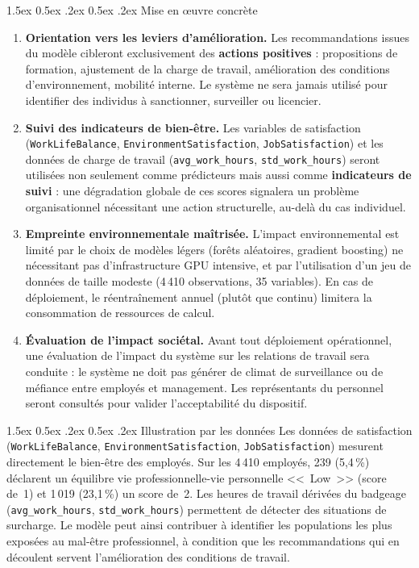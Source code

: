 \documentclass[12pt,a4paper]{article}
\makeatletter
\renewcommand\paragraph{\@startsection{paragraph}{4}{\z@}%
  {1.5ex \@plus 0.5ex \@minus .2ex}%
  {0.5ex \@plus .2ex}%
  {\normalfont\normalsize\bfseries}}
\makeatother
\begin{document}
\paragraph{Mise en \oe uvre concrète}
\begin{enumerate}
    \item \textbf{Orientation vers les leviers d'amélioration.} Les recommandations issues du modèle cibleront exclusivement des \textbf{actions positives} : propositions de formation, ajustement de la charge de travail, amélioration des conditions d'environnement, mobilité interne. Le système ne sera jamais utilisé pour identifier des individus à sanctionner, surveiller ou licencier.
    \item \textbf{Suivi des indicateurs de bien-être.} Les variables de satisfaction (\texttt{WorkLifeBalance}, \texttt{EnvironmentSatisfaction}, \texttt{JobSatisfaction}) et les données de charge de travail (\texttt{avg\_work\_hours}, \texttt{std\_work\_hours}) seront utilisées non seulement comme prédicteurs mais aussi comme \textbf{indicateurs de suivi} : une dégradation globale de ces scores signalera un problème organisationnel nécessitant une action structurelle, au-delà du cas individuel.
    \item \textbf{Empreinte environnementale maîtrisée.} L'impact environnemental est limité par le choix de modèles légers (forêts aléatoires, gradient boosting) ne nécessitant pas d'infrastructure GPU intensive, et par l'utilisation d'un jeu de données de taille modeste (4\,410 observations, 35 variables). En cas de déploiement, le réentraînement annuel (plutôt que continu) limitera la consommation de ressources de calcul.
    \item \textbf{Évaluation de l'impact sociétal.} Avant tout déploiement opérationnel, une évaluation de l'impact du système sur les relations de travail sera conduite : le système ne doit pas générer de climat de surveillance ou de méfiance entre employés et management. Les représentants du personnel seront consultés pour valider l'acceptabilité du dispositif.
\end{enumerate}

\paragraph{Illustration par les données}
Les données de satisfaction (\texttt{WorkLifeBalance}, \texttt{EnvironmentSatisfaction}, \texttt{JobSatisfaction}) mesurent directement le bien-être des employés. Sur les 4\,410 employés, 239 (5,4\,\%) déclarent un équilibre vie professionnelle-vie personnelle <<~Low~>> (score de~1) et 1\,019 (23,1\,\%) un score de~2. Les heures de travail dérivées du badgeage (\texttt{avg\_work\_hours}, \texttt{std\_work\_hours}) permettent de détecter des situations de surcharge. Le modèle peut ainsi contribuer à identifier les populations les plus exposées au mal-être professionnel, à condition que les recommandations qui en découlent servent l'amélioration des conditions de travail.
\end{document}
